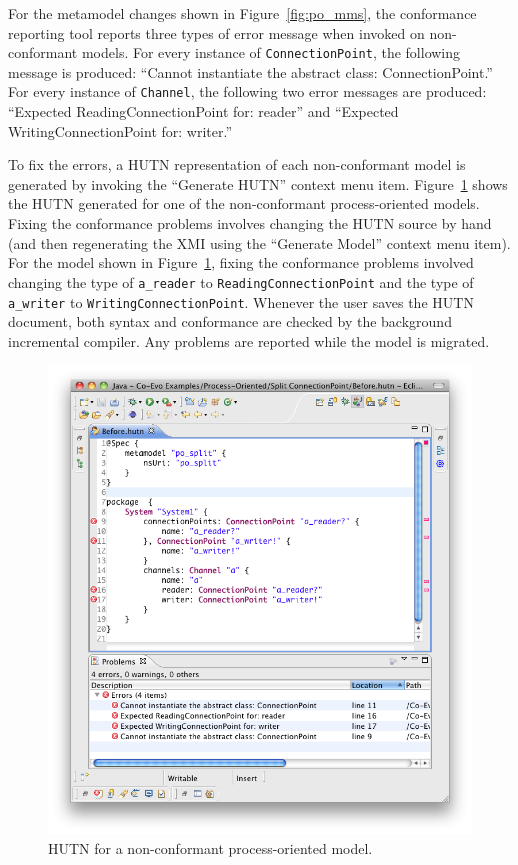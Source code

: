 For the metamodel changes shown in Figure~\ref{fig:po_mms}, the conformance reporting tool reports three types of error message when invoked on non-conformant models. For every instance of \texttt{Co\-nn\-ec\-ti\-o\-nPo\-i\-nt}, the following message is produced: ``Cannot instantiate the abstract class: ConnectionPoint.'' For every instance of \texttt{Ch\-an\-n\-el}, the following two error messages are produced: ``Expected ReadingConnectionPoint for: reader'' and ``Expected WritingConnectionPoint for: writer.''

To fix the errors, a HUTN representation of each non-conformant model is generated by invoking the ``Generate HUTN'' context menu item. Figure~\ref{fig:po_hutn} shows the HUTN generated for one of the non-conformant process-oriented models. Fixing the conformance problems involves changing the HUTN source by hand (and then regenerating the XMI using the ``Generate Model'' context menu item). For the model shown in Figure~\ref{fig:po_hutn}, fixing the conformance problems involved changing the type of \texttt{a\_reader} to \texttt{Re\-ad\-i\-ngCo\-nn\-ec\-ti\-o\-nPo\-i\-nt} and the type of \texttt{a\_writer} to \texttt{Wr\-i\-ti\-ngCo\-nn\-ec\-ti\-o\-nPo\-i\-nt}. Whenever the user saves the HUTN document, both syntax and conformance are checked by the background incremental compiler. Any problems are reported while the model is migrated.

\begin{figure}[htbp]
  \centering
  \includegraphics[width=13.5cm]{6.Evaluation/images/po_hutn.png}
  \caption{HUTN for a non-conformant process-oriented model.}
  \label{fig:po_hutn}
\end{figure}

